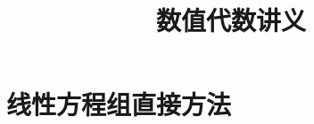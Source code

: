 \documentclass{book}
\begin{document}
\title{数值代数讲义}
\maketitle

\chapter{线性方程组直接方法}


\cite{stein2003}


\end{document}
